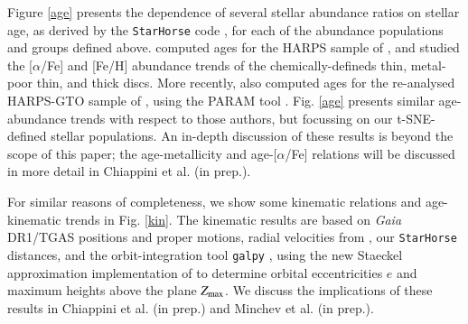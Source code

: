 \documentclass{aa}  %
\begin{document}
Figure \ref{age} presents the dependence of several stellar abundance ratios on stellar age, as derived by the {\tt StarHorse} code \citep{Queiroz2018}, for each of the abundance populations and groups defined above. \citet{Haywood2013} computed ages for the HARPS sample of \citet{Adibekyan2012}, and studied the [$\alpha$/Fe] and [Fe/H] abundance trends of the chemically-defineds thin, metal-poor thin, and thick discs. More recently, \citet{DelgadoMena2017} also computed ages for the re-analysed HARPS-GTO sample of \citet{DelgadoMena2018}, using the PARAM tool \citep{daSilva2006}. Fig. \ref{age} presents similar age-abundance trends with respect to those authors, but focussing on our t-SNE-defined stellar populations. An in-depth discussion of these results is beyond the scope of this paper; the age-metallicity and age-[$\alpha$/Fe] relations will be discussed in more detail in Chiappini et al. (in prep.).


For similar reasons of completeness, we show some kinematic relations and age-kinematic trends in Fig. \ref{kin}. The kinematic results are based on {\it Gaia} DR1/TGAS positions and proper motions, radial velocities from \citet{Adibekyan2012}, our {\tt StarHorse} distances, and the orbit-integration tool {\tt galpy} \citep{Bovy2015}, using the new Staeckel approximation implementation of \citet{Mackereth2018} to determine orbital eccentricities $e$ and maximum heights above the plane $Z_{\rm max}$. We discuss the implications of these results in Chiappini et al. (in prep.) and Minchev et al. (in prep.).
\end{document}
